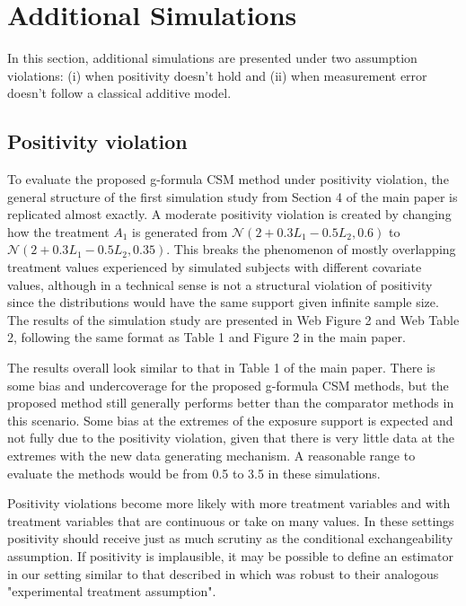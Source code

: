 \documentclass[12pt]{article}
\begin{document}
\section{Additional Simulations}

In this section, additional simulations are presented under two assumption violations: (i) when positivity doesn't hold and (ii) when measurement error doesn't follow a classical additive model.

\subsection{Positivity violation}

To evaluate the proposed g-formula CSM method under positivity violation, the general structure of the first simulation study from Section 4 of the main paper is replicated almost exactly. A moderate positivity violation is created by changing how the treatment $A_{1}$ is generated from $\mathcal{N}(2 + 0.3L_{1} - 0.5L_{2}, 0.6)$ to $\mathcal{N}(2 + 0.3L_{1} - 0.5L_{2}, 0.35)$. This breaks the phenomenon of mostly overlapping treatment values experienced by simulated subjects with different covariate values, although in a technical sense is not a structural violation of positivity since the distributions would have the same support given infinite sample size. The results of the simulation study are presented in Web Figure 2 and Web Table 2, following the same format as Table 1 and Figure 2 in the main paper.

The results overall look similar to that in Table 1 of the main paper. There is some bias and undercoverage for the proposed g-formula CSM methods, but the proposed method still generally performs better than the comparator methods in this scenario. Some bias at the extremes of the exposure support is expected and not fully due to the positivity violation, given that there is very little data at the extremes with the new data generating mechanism. A reasonable range to evaluate the methods would be from 0.5 to 3.5 in these simulations.

Positivity violations become more likely with more treatment variables and with treatment variables that are continuous or take on many values. In these settings positivity should receive just as much scrutiny as the conditional exchangeability assumption. If positivity is implausible, it may be possible to define an estimator in our setting similar to that described in \citet{neugebauer2005} which was robust to their analogous "experimental treatment assumption".
\end{document}

